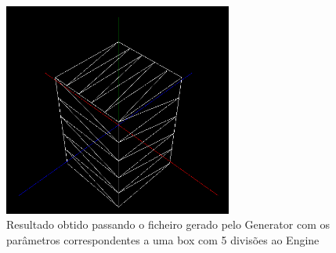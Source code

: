 \documentclass{article}
\begin{document}
\begin{figure}[ht!]
\centering
\includegraphics[height=7cm]{box.png}
\caption{Resultado obtido passando o ficheiro gerado pelo Generator com os parâmetros correspondentes a uma box com 5 divisões ao Engine}
\end{figure}
\end{document}
